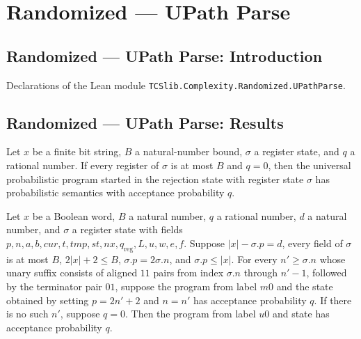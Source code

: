 \section{Randomized --- UPath Parse}
\subsection*{Randomized --- UPath Parse: Introduction}

Declarations of the Lean module \texttt{TCSlib.Complexity.Randomized.UPathParse}.

\subsection*{Randomized --- UPath Parse: Results}

\begin{lemma}
\label{Complexity.LogProg.ups_rej}
\leanok
{}
Let $x$ be a finite bit string, $B$ a natural-number bound, $\sigma$ a register state,
and $q$ a rational number. If every register of $\sigma$ is at most $B$ and $q=0$, then
the universal probabilistic program started in the rejection state with register state
$\sigma$ has probabilistic semantics with acceptance probability $q$.
\end{lemma}

\begin{lemma}
\label{Complexity.LogProg.ups_unary}
\leanok
{}
Let $x$ be a Boolean word, $B$ a natural number, $q$ a rational number, $d$ a natural
number, and $\sigma$ a register state with fields $p,n,a,b,cur,t,tmp,st,nx,q_{\mathrm{reg}},L,u,w,e,f$.
Suppose $|x|-\sigma.p=d$, every field of $\sigma$ is at most $B$,
$2|x|+2\le B$, $\sigma.p=2\sigma.n$, and $\sigma.p\le |x|$. For every $n\prime\ge\sigma.n$
whose unary suffix consists of aligned $11$ pairs from index $\sigma.n$ through $n\prime-1$,
followed by the terminator pair $01$, suppose the program from label $m0$ and the state
obtained by setting $p=2n\prime+2$ and $n=n\prime$ has acceptance probability $q$.
If there is no such $n\prime$, suppose $q=0$. Then the program from label $u0$ and state
\sigma has acceptance probability $q$.
\end{lemma}

